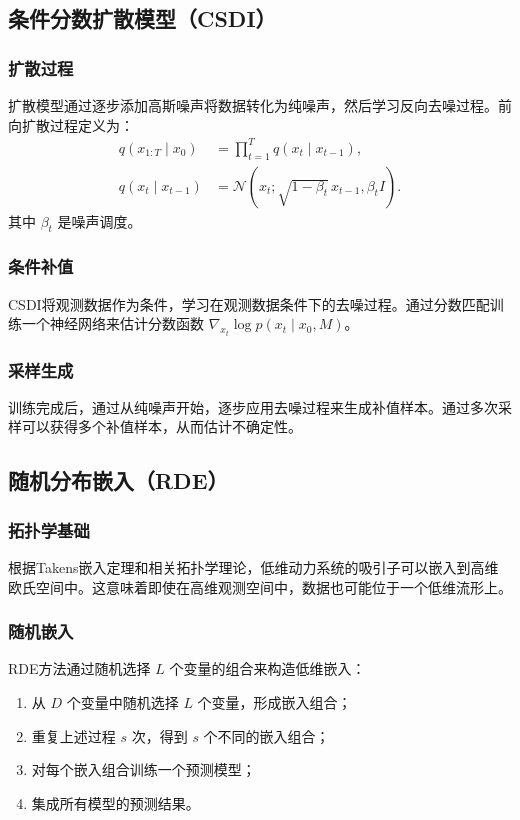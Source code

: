 \documentclass[12pt,a4paper]{article}
\begin{document}
\subsection{条件分数扩散模型（CSDI）}

\subsubsection{扩散过程}
扩散模型通过逐步添加高斯噪声将数据转化为纯噪声，然后学习反向去噪过程。前向扩散过程定义为：
\begin{align}
q(x_{1:T}\mid x_0) &= \prod_{t=1}^T q(x_t\mid x_{t-1}),\\
q(x_t\mid x_{t-1}) &= \mathcal{N}(x_t;\sqrt{1-\beta_t}\,x_{t-1},\beta_t I).
\end{align}
其中 $\beta_t$ 是噪声调度。

\subsubsection{条件补值}
CSDI将观测数据作为条件，学习在观测数据条件下的去噪过程。通过分数匹配训练一个神经网络来估计分数函数 $\nabla_{x_t}\log p(x_t\mid x_0,M)$。

\subsubsection{采样生成}
训练完成后，通过从纯噪声开始，逐步应用去噪过程来生成补值样本。通过多次采样可以获得多个补值样本，从而估计不确定性。

\subsection{随机分布嵌入（RDE）}

\subsubsection{拓扑学基础}
根据Takens嵌入定理和相关拓扑学理论，低维动力系统的吸引子可以嵌入到高维欧氏空间中。这意味着即使在高维观测空间中，数据也可能位于一个低维流形上。

\subsubsection{随机嵌入}
RDE方法通过随机选择 $L$ 个变量的组合来构造低维嵌入：
\begin{enumerate}
    \item 从 $D$ 个变量中随机选择 $L$ 个变量，形成嵌入组合；
    \item 重复上述过程 $s$ 次，得到 $s$ 个不同的嵌入组合；
    \item 对每个嵌入组合训练一个预测模型；
    \item 集成所有模型的预测结果。
\end{enumerate}
\end{document}
